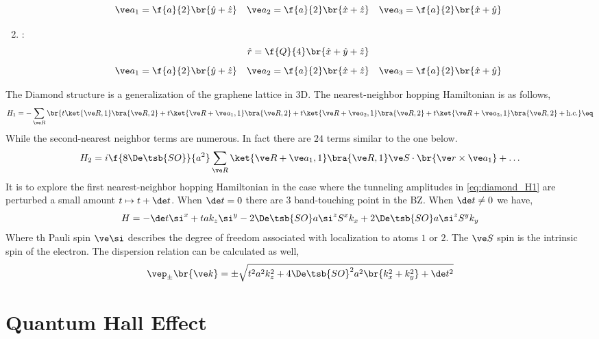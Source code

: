 \documentclass{article}
\begin{document}
\begin{enumerate}
\begin{center}
    \end{center}
    \[ \ve a_1 = \f{a}{2} \br{\hat y + \hat z} \quad \ve a_2 = \f{a}{2} \br{\hat x + \hat z} \quad \ve a_3 = \f{a}{2} \br{\hat x + \hat y} \]
    \item {}:
    \[ \hat r = \f{Q}{4}\br{\hat x + \hat y + \hat z} \]
    \[ \ve a_1 = \f{a}{2} \br{\hat y + \hat z} \quad \ve a_2 = \f{a}{2} \br{\hat x + \hat z} \quad \ve a_3 = \f{a}{2} \br{\hat x + \hat y} \]
\end{enumerate}

The Diamond structure is a generalization of the graphene lattice in 3D. The nearest-neighbor hopping Hamiltonian is as follows,
\[ H_1 = - \sum_{\ve R} \br{t \ket{\ve R, 1}\bra{\ve R, 2} + t \ket{\ve R + \ve a_1, 1}\bra{\ve R, 2} + t \ket{\ve R + \ve a_2, 1}\bra{\ve R, 2} + t \ket{\ve R + \ve a_3, 1} \bra{\ve R, 2} + \text{h.c.}} \eq \label{eq:diamond_H1}\]
While the second-nearest neighbor terms are numerous. In fact there are $24$ terms similar to the one below.
\[ H_2 = i \f{8 \De\tsb{SO}}{a^2} \sum_{\ve R} \ket{\ve R + \ve a_1,1} \bra{\ve R, 1} \ve S \cdot \br{\ve r \times \ve a_1} + \ldots \]
It is to explore the first nearest-neighbor hopping Hamiltonian in the case where the tunneling amplitudes in \cref{eq:diamond_H1} are perturbed a small amount $t \mapsto t + \de t$. When $\de t = 0$ there are $3$ band-touching point in the BZ. When $\de t \neq 0$ we have,
\[ H = - \de t \si^{x} + t a k_z \si^{y} - 2 \De\tsb{SO} a \si^{z} S^{x} k_x + 2 \De\tsb{SO} a \si^{z} S^{y} k_y \]
Where th Pauli spin $\ve \si$ describes the degree of freedom associated with localization to atoms $1$ or $2$. The $\ve S$ spin is the intrinsic spin of the electron. The dispersion relation can be calculated as well,
\[ \vep_{\pm}\br{\ve k} = \pm \sqrt{t^2 a^2 k_z^2 + 4 \De\tsb{SO}^2 a^2 \br{k_x^2 + k_y^2} + \de t^2} \]

\section{Quantum Hall Effect}
\end{document}
